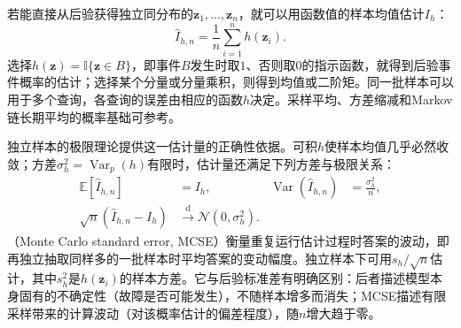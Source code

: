 若能直接从后验获得独立同分布的$\bm{z}_1,\ldots,\bm{z}_n$，就可以用函数值的样本均值估计$I_h$：
\begin{equation}
  \widehat I_{h,n}=\frac{1}{n}\sum_{i=1}^{n}h(\bm{z}_i).
  \label{eq:pgm-sampling-direct-estimator}
\end{equation}
选择$h(\bm{z})=\mathbb{I}\{\bm{z}\in B\}$，即事件$B$发生时取$1$、否则取$0$的指示函数，就得到后验事件概率的估计；选择某个分量或分量乘积，则得到均值或二阶矩。同一批样本可以用于多个查询，各查询的误差由相应的函数$h$决定。采样平均、方差缩减和Markov链长期平均的概率基础可参考。

独立样本的极限理论提供这一估计量的正确性依据。可积$h$使样本均值几乎必然收敛；方差$\sigma_h^2=\operatorname{Var}_p(h)$有限时，估计量还满足下列方差与极限关系：
\begin{equation}
  \begin{aligned}
    \mathbb{E}[\widehat I_{h,n}]&=I_h,&
    \operatorname{Var}(\widehat I_{h,n})&=\frac{\sigma_h^2}{n},\\
    \sqrt n(\widehat I_{h,n}-I_h)&\xrightarrow{\mathrm{d}}
      \mathcal{N}(0,\sigma_h^2).
  \end{aligned}
  \label{eq:pgm-sampling-iid-clt}
\end{equation}
（Monte Carlo standard error, MCSE）衡量重复运行估计过程时答案的波动，即再独立抽取同样多的一批样本时平均答案的变动幅度。独立样本下可用$s_h/\sqrt n$估计，其中$s_h^2$是$h(\bm z_i)$的样本方差。它与后验标准差有明确区别：后者描述模型本身固有的不确定性（故障是否可能发生），不随样本增多而消失；MCSE描述有限采样带来的计算波动（对该概率估计的偏差程度），随$n$增大趋于零。


